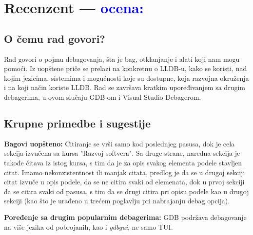 \documentclass[a4paper]{report}
\newcommand{\odgovor}[1]{\textcolor{blue}{#1}}
\begin{document}
\chapter{Recenzent \odgovor{--- ocena:} }


\section{O čemu rad govori?}
Rad govori o pojmu debagovanja, šta je bag, otklanjanje i alati koji nam mogu pomoći. Iz uopštene priče se prelazi na konkretnu o LLDB-u, kako se koristi, nad kojim jezicima, sistemima i mogućnosti
koje su dostupne, koja razvojna okruženja i na koji način koriste LLDB. Rad se završava kratkim upoređivanjem sa drugim debagerima, u ovom slučaju GDB-om i Visual Studio Debagerom.

\section{Krupne primedbe i sugestije}
\textbf{Bagovi uopšteno:} Citiranje se vrši samo kod poslednjeg pasusa, dok je cela sekcija izvučena sa kursa "Razvoj softvera". Sa druge strane, naredna sekcija je takođe
čitava iz istog kursa, s tim da je za opis svakog elementa podele stavljen citat. Imamo nekonzistentnost ili manjak citata, predlog je da se u drugoj sekciji citat izvuče u opis podele,
da se ne citira svaki od elemenata, dok u prvoj sekciji da se citira svaki od pasusa, s tim da se drugi citira pri opisu podele kao u drugoj sekciji (kao što je urađeno u trećem poglavlju
pri nabrajanju debag opcija).

\textbf{Poređenje sa drugim popularnim debagerima: } GDB podržava debagovanje na više jezika od pobrojanih, kao i  \textit{gdbgui}, ne samo TUI.
\end{document}

